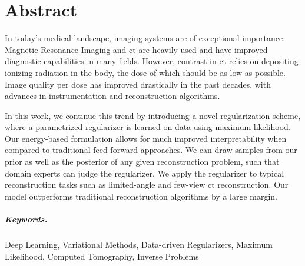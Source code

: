 \chapter*{Abstract}

In today's medical landscape, imaging systems are of exceptional importance.
Magnetic Resonance Imaging and \gls{ct} are heavily used and have improved diagnostic capabilities in many fields.
However, contrast in \gls{ct} relies on depositing ionizing radiation in the body, the dose of which should be as low as possible.
Image quality per dose has improved drastically in the past decades, with advances in instrumentation and reconstruction algorithms.

In this work, we continue this trend by introducing a novel regularization scheme, where a parametrized regularizer is learned on data using maximum likelihood.
Our energy-based formulation allows for much improved interpretability when compared to traditional feed-forward approaches.
We can draw samples from our prior as well as the posterior of any given reconstruction problem, such that domain experts can judge the regularizer.
We apply the regularizer to typical reconstruction tasks such as limited-angle and few-view \gls{ct} reconstruction.
Our model outperforms traditional reconstruction algorithms by a large margin.
\paragraph{Keywords.} Deep Learning, Variational Methods, Data-driven Regularizers, Maximum Likelihood, Computed Tomography, Inverse Problems
